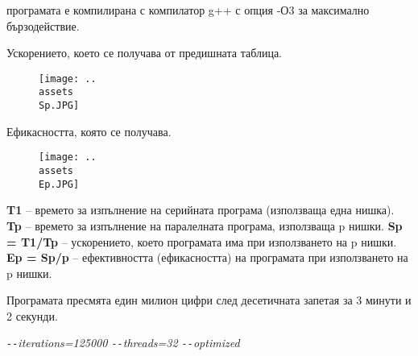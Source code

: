 \documentclass[a4paper,english]{article}
\begin{document}
\vspace{15mm}
\newline
    програмата е компилирана с компилатор g++ с опция -О3 за максимално бързодействие.
    
    Ускорението, което се получава от предишната таблица.
    
\begin{figure}[H]
    \hspace*{-2cm}
    \centering
    \texttt{[image: ..\\assets\\Sp.JPG]}
\end{figure}
\newpage
    Ефикасността, която се получава.
    
\begin{figure}[H]
    \centering
    \texttt{[image: ..\\assets\\Ep.JPG]}
\end{figure}

    
    
\textbf{T1} – времето за изпълнение на серийната програма (използваща една нишка). \newline
\textbf{Tp} – времето за изпълнение на паралелната програма, използваща p нишки. \newline
\textbf{Sp = T1/Tp} – ускорението, което програмата има при използването на p нишки. \newline
\textbf{Ep = Sp/p} – ефективността (ефикасността) на програмата при използването на p нишки.

Програмата пресмята един милион цифри след десетичната запетая за 3 минути и 2 секунди.
	\begin{center}
		\textit{\texttt{-{}-}iterations=125000 \texttt{-{}-}threads=32 \texttt{-{}-}optimized}
	\end{center}
\end{document}
